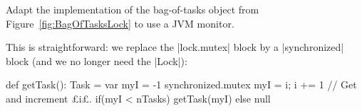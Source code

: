 \begin{questionS}
Adapt the implementation of the bag-of-tasks object from
Figure~\ref{fig:BagOfTasksLock} to use a JVM monitor.
\end{questionS}

\begin{answerS}
This is straightforward: we replace the |lock.mutex| block by a |synchronized|
block (and we no longer need the |Lock|):
%
\begin{scala}
  def getTask(): Task = {
    var myI = -1
    synchronized.mutex{ myI = i; i += 1} // Get and increment £i£.
    if(myI < nTasks) getTask(myI) else null
  }
\end{scala}
\end{answerS}
